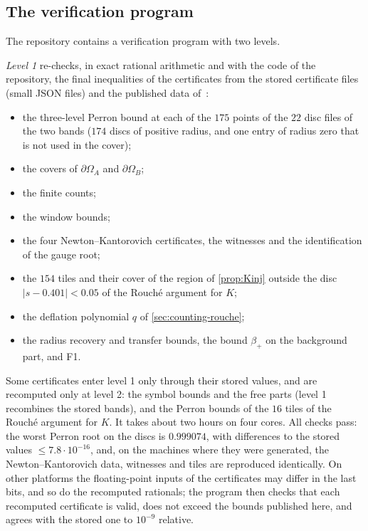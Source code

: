 \subsection{The verification program}\label{sec:computation-verify}

The repository contains a verification program with two levels.

\emph{Level 1} re-checks, in exact rational arithmetic and with the code of the repository, the final inequalities
of the certificates from the stored certificate files (small JSON files) and the published data of~\cite{RT2019}:
\begin{itemize}[leftmargin=*]
\item the three-level Perron bound at each of the $175$ points of the $22$ disc files of the two bands ($174$ discs of
  positive radius, and one entry of radius zero that is not used in the cover);
\item the covers of $\partial\Omega_A$ and $\partial\Omega_B$;
\item the finite counts;
\item the window bounds;
\item the four Newton--Kantorovich certificates, the witnesses and the identification of the gauge root;
\item the $154$ tiles and their cover of the region of \cref{prop:Kinj} outside the disc $|s-0.401|<0.05$ of the
  Rouch\'e argument for $K$;
\item the deflation polynomial $q$ of \cref{sec:counting-rouche};
\item the radius recovery and transfer bounds, the bound $\beta_+$ on the background part, and F1.
\end{itemize}
Some certificates enter level 1 only through their stored values, and are recomputed only at level 2: the symbol
bounds and the free parts (level 1 recombines the stored bands), and the Perron bounds of the $16$ tiles of the
Rouch\'e argument for $K$.
It takes about two hours on four cores. All checks pass: the worst Perron root on the discs is $0.999074$, with
differences to the stored values $\le7.8\cdot10^{-16}$, and, on the machines where they were generated, the
Newton--Kantorovich data, witnesses and tiles are reproduced identically. On other platforms the floating-point
inputs of the certificates may differ in the last bits, and so do the recomputed rationals; the program then checks
that each recomputed certificate is valid, does not exceed the bounds published here, and agrees with the stored one
to $10^{-9}$ relative.

